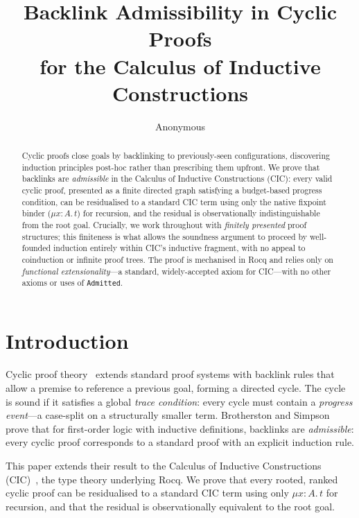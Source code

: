 \documentclass[runningheads]{llncs}
\title{Backlink Admissibility in Cyclic Proofs\\
       for the Calculus of Inductive Constructions}
\author{Anonymous}
\begin{document}
\maketitle

\begin{abstract}
Cyclic proofs close goals by backlinking to previously-seen configurations,
discovering induction principles post-hoc rather than prescribing them upfront.
We prove that backlinks are \emph{admissible} in the Calculus of Inductive
Constructions (CIC): every valid cyclic proof, presented as a finite directed
graph satisfying a budget-based progress condition, can be residualised to a
standard CIC term using only the native fixpoint binder ($\mu x{:}A.\,t$) for
recursion, and the residual is observationally indistinguishable from the root
goal.  Crucially, we work throughout with \emph{finitely presented} proof
structures; this finiteness is what allows the soundness argument to proceed by
well-founded induction entirely within CIC's inductive fragment, with no appeal
to coinduction or infinite proof trees.  The proof is mechanised in Rocq
and relies only on \emph{functional extensionality}---a standard, widely-accepted
axiom for CIC---with no other axioms or uses of \texttt{Admitted}.
\end{abstract}

\section{Introduction}

Cyclic proof theory~\cite{brotherston-2006-cyclic,brotherston-simpson-2011-sequent}
extends standard proof systems with backlink rules that allow a premise to
reference a previous goal, forming a directed cycle.  The cycle is sound if
it satisfies a global \emph{trace condition}: every cycle must contain a
\emph{progress event}---a case-split on a structurally smaller term.
Brotherston and Simpson prove that for first-order logic with inductive
definitions, backlinks are \emph{admissible}: every cyclic proof corresponds
to a standard proof with an explicit induction rule.

This paper extends their result to the Calculus of Inductive Constructions
(CIC)~\cite{coquand-huet-1988-coc,paulin-mohring-1993-inductive}, the type
theory underlying Rocq.  We prove that every rooted, ranked cyclic proof
can be residualised to a standard CIC term using only $\mu x{:}A.\,t$ for
recursion, and that the residual is observationally equivalent to the
root goal.
\end{document}
